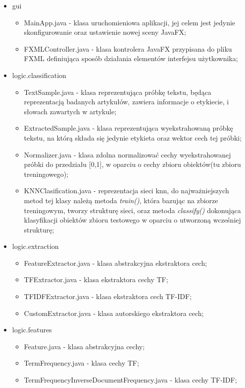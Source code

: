 \documentclass{classrep}
\begin{document}
\begin{itemize}
	\item gui
	\begin{itemize}
		\item MainApp.java - klasa uruchomieniowa aplikacji, jej celem jest jedynie skonfigurowanie oraz ustawienie nowej sceny JavaFX;
		\item FXMLController.java - klasa kontrolera JavaFX przypisana do pliku FXML definiująca sposób działania elementów interfejsu użytkownika;
	\end{itemize}
	\item logic.classification
	\begin{itemize}
		\item TextSample.java - klasa reprezentująca próbkę tekstu, będąca reprezentacją badanych artykułów, zawiera informacje o etykiecie, i słowach zawartych w artykule;
		\item ExtractedSample.java - klasa reprezentująca wyekstrahowaną próbkę tekstu, na którą składa się jedynie etykieta oraz wektor cech tej próbki;
		\item Normalizer.java - klasa zdolna normalizować cechy wyekstrahowanej próbki do przedziału [0,1], w oparciu o cechy zbioru obiektów(tu zbioru treningowego);
		\item KNNClasification.java - reprezentacja sieci knn, do najważniejszych metod tej klasy należą metoda \textit{train()}, która bazując na zbiorze treningowym, tworzy strukturę sieci, oraz metoda \textit{classify()} dokonująca klasyfikacji obiektów zbioru testowego w oparciu o utworzoną wcześniej strukturę;
	\end{itemize}
	\item logic.extraction
	\begin{itemize}
		\item FeatureExtractor.java - klasa abstrakcyjna ekstraktora cech;
		\item TFExtractor.java - klasa ekstraktora cechy TF;
		\item TFIDFExtractor.java - klasa ekstraktora cech TF-IDF;
		\item CustomExtractor.java - klasa autorskiego ekstraktora cech;
	\end{itemize}
	\item logic.features
	\begin{itemize}
		\item Feature.java - klasa abstrakcyjna cechy;
		\item TermFrequency.java - klasa cechy TF;
		\item TermFrequencyInverseDocumentFrequency.java - klasa cechy TF-IDF; 

\end{itemize}
\end{itemize}
\end{document}
